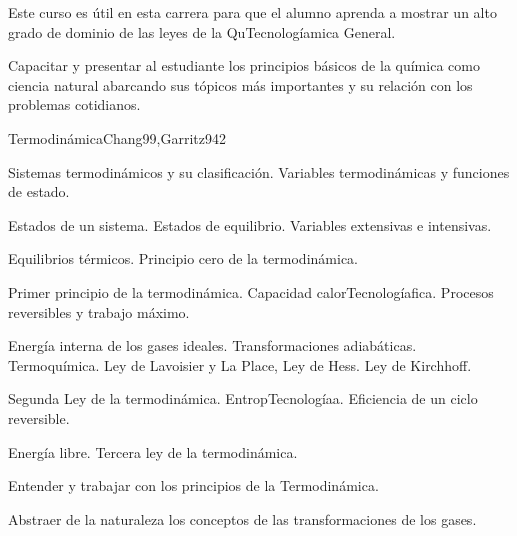 \begin{syllabus}


\begin{justification}
Este curso es útil en esta carrera para que el alumno aprenda a mostrar un alto grado de dominio de las leyes de la QuTecnologíamica General.
\end{justification}

\begin{goals}
\item Capacitar y presentar al estudiante los principios básicos de la química como ciencia natural abarcando sus tópicos más importantes y su relación con los problemas cotidianos.
\end{goals}

\begin{outcomes}
\end{outcomes}

\begin{unit}{Termodinámica}{Chang99,Garritz94}{2}
\begin{topics}
	\item Sistemas termodinámicos y su clasificación. Variables termodinámicas y funciones de estado.
	\item Estados de un sistema. Estados de equilibrio. Variables extensivas e intensivas.
	\item Equilibrios térmicos. Principio cero de la termodinámica.
	\item Primer principio de la termodinámica. Capacidad calorTecnologíafica. Procesos reversibles y trabajo máximo.
	\item Energía interna de los gases ideales. Transformaciones adiabáticas. Termoquímica. Ley de Lavoisier y La Place, Ley de Hess. Ley de Kirchhoff.
	\item Segunda Ley de la termodinámica. EntropTecnologíaa. Eficiencia de un ciclo reversible.
	\item Energía libre. Tercera ley de la termodinámica.
\end{topics}

\begin{unitgoals}
	\item Entender y trabajar con los principios de la Termodinámica.
	\item Abstraer de la naturaleza los conceptos de las transformaciones de los gases.
\end{unitgoals}
\end{unit}


\end{syllabus}
